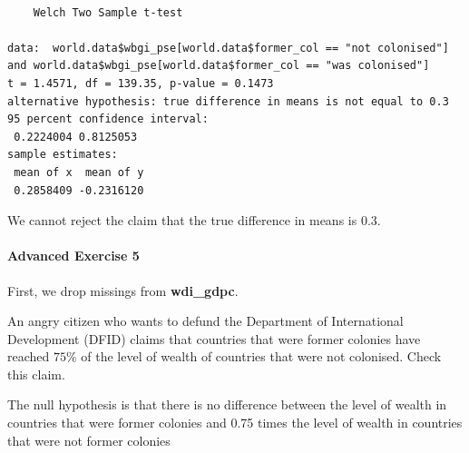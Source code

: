 \documentclass[]{article}
\newenvironment{Shaded}{\begin{snugshade}}{\end{snugshade}}
\newcommand{\KeywordTok}[1]{\textcolor[rgb]{0.13,0.29,0.53}{\textbf{#1}}}
\newcommand{\FloatTok}[1]{\textcolor[rgb]{0.00,0.00,0.81}{#1}}
\newcommand{\StringTok}[1]{\textcolor[rgb]{0.31,0.60,0.02}{#1}}
\newcommand{\CommentTok}[1]{\textcolor[rgb]{0.56,0.35,0.01}{\textit{#1}}}
\newcommand{\OperatorTok}[1]{\textcolor[rgb]{0.81,0.36,0.00}{\textbf{#1}}}
\newcommand{\NormalTok}[1]{#1}
\let\oldparagraph\paragraph
\renewcommand{\paragraph}[1]{\oldparagraph{#1}\mbox{}}
\theoremstyle{definition}
\theoremstyle{definition}
\theoremstyle{definition}
\theoremstyle{remark}
\begin{document}
\begin{verbatim}

    Welch Two Sample t-test

data:  world.data$wbgi_pse[world.data$former_col == "not colonised"] and world.data$wbgi_pse[world.data$former_col == "was colonised"]
t = 1.4571, df = 139.35, p-value = 0.1473
alternative hypothesis: true difference in means is not equal to 0.3
95 percent confidence interval:
 0.2224004 0.8125053
sample estimates:
 mean of x  mean of y 
 0.2858409 -0.2316120 
\end{verbatim}

We cannot reject the claim that the true difference in means is 0.3.

\paragraph{Advanced Exercise 5}\label{advanced-exercise-5}

First, we drop missings from \textbf{wdi\_gdpc}.

\begin{Shaded}
\end{Shaded}

An angry citizen who wants to defund the Department of International
Development (DFID) claims that countries that were former colonies have
reached \(75\%\) of the level of wealth of countries that were not
colonised. Check this claim.

The null hypothesis is that there is no difference between the level of
wealth in countries that were former colonies and 0.75 times the level
of wealth in countries that were not former colonies

\begin{Shaded}
\end{Shaded}
\end{document}
